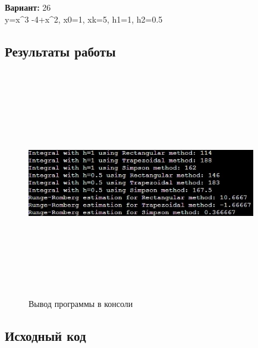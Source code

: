 {\bfseries Вариант:} 26\\
y=x^3 -4+x^2, x0=1, xk=5, h1=1, h2=0.5

\subsection{Результаты работы}
\begin{figure}[h!]
\centering
\includegraphics[width=10cm, height=10cm]{img/img5}
\caption{Вывод программы в консоли}
\end{figure}
\pagebreak


\subsection{Исходный код}


